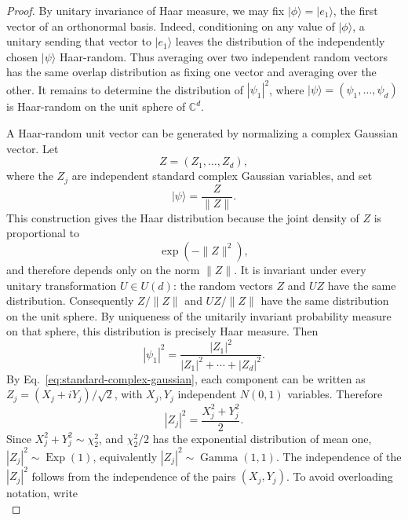 \documentclass[aps,pra,reprint,superscriptaddress,nofootinbib,longbibliography]{revtex4-2}
\newcommand{\ket}[1]{| #1 \rangle}
\begin{document}
\begin{proof}
By unitary invariance of Haar measure, we may fix
$\ket{\phi}=\ket{e_1}$, the first vector of an orthonormal basis.  Indeed,
conditioning on any value of $\ket{\phi}$, a unitary sending that vector to
$\ket{e_1}$ leaves the distribution of the independently chosen $\ket{\psi}$
Haar-random.  Thus averaging over two independent random vectors has the same
overlap distribution as fixing one vector and averaging over the other.  It
remains to determine the distribution of $|\psi_1|^2$, where
$\ket{\psi}=(\psi_1,\ldots,\psi_d)$ is Haar-random on the unit sphere of
$\mathbb C^d$.

A Haar-random unit vector can be generated by normalizing a complex Gaussian
vector.  Let
\begin{equation}
    Z=(Z_1,\ldots,Z_d),
\end{equation}
where the $Z_j$ are independent standard complex Gaussian variables, and set
\begin{equation}
    \ket{\psi}=\frac{Z}{\|Z\|} .
\end{equation}
This construction gives the Haar distribution because the joint density of
$Z$ is proportional to
\begin{equation}
    \exp(-\|Z\|^2),
\end{equation}
and therefore depends only on the norm $\|Z\|$.  It is invariant under every
unitary transformation $U\in U(d)$: the random vectors $Z$ and $UZ$ have the
same distribution. Consequently $Z/\|Z\|$ and $UZ/\|Z\|$ have the same
distribution on the unit sphere.  By uniqueness of the unitarily invariant
probability measure on that sphere, this distribution is precisely Haar
measure.  Then
\begin{equation}
    |\psi_1|^2
    =
    \frac{|Z_1|^2}{|Z_1|^2+\cdots+|Z_d|^2} .
\end{equation}
By Eq.~\eqref{eq:standard-complex-gaussian}, each component can be written as
$Z_j=(X_j+iY_j)/\sqrt2$, with $X_j,Y_j$ independent $N(0,1)$ variables.
Therefore
\begin{equation}
    |Z_j|^2
    =
    \frac{X_j^2+Y_j^2}{2}.
\end{equation}
Since $X_j^2+Y_j^2\sim\chi^2_2$, and $\chi^2_2/2$ has the exponential
distribution of mean one, $|Z_j|^2\sim\operatorname{Exp}(1)$, equivalently
$|Z_j|^2\sim\operatorname{Gamma}(1,1)$.  The independence of the $|Z_j|^2$
follows from the independence of the pairs $(X_j,Y_j)$.  To avoid overloading
notation, write
\begin{equation}

\end{equation}
\end{proof}
\end{document}
